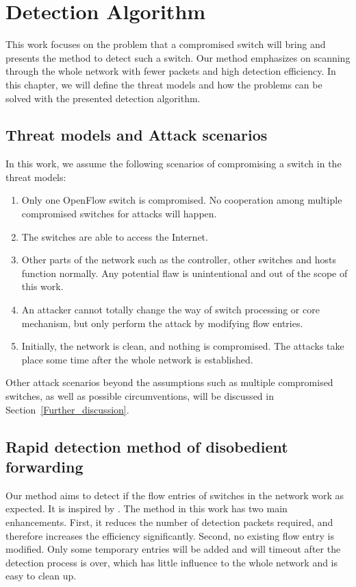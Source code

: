 \chapter{Detection Algorithm}
This work focuses on the problem that a compromised switch will bring and presents the method to detect such a switch. Our method emphasizes on scanning through the whole network with fewer packets and high detection efficiency. In this chapter, we will define the threat models and how the problems can be solved with the presented detection algorithm.

\section{Threat models and Attack scenarios}
In this work, we assume the following scenarios of compromising a switch in the threat models:
\begin{enumerate}
\item
Only one OpenFlow switch is compromised. No cooperation among multiple compromised switches for attacks will happen. 
\item
The switches are able to access the Internet. 
\item
Other parts of the network such as the controller, other switches and hosts function normally. Any potential flaw is unintentional and out of the scope of this work.
\item
An attacker cannot totally change the way of switch processing or core mechanism, but only perform the attack by modifying flow entries.
\item
Initially, the network is clean, and nothing is compromised. The attacks take place some time after the whole network is established.
\end{enumerate}

Other attack scenarios beyond the assumptions such as multiple compromised switches, as well as possible circumventions, will be discussed in Section~\ref{Further_discussion}.

\section{Rapid detection method of disobedient forwarding}
Our method aims to detect if the flow entries of switches in the network work as expected. It is inspired by \cite{CKGL15}. The method in this work has two main enhancements. First, it reduces the number of detection packets required, and therefore increases the efficiency significantly. Second, no existing flow entry is modified. Only some temporary entries will be added and will timeout after the detection process is over, which has little influence to the whole network and is easy to clean up. 

